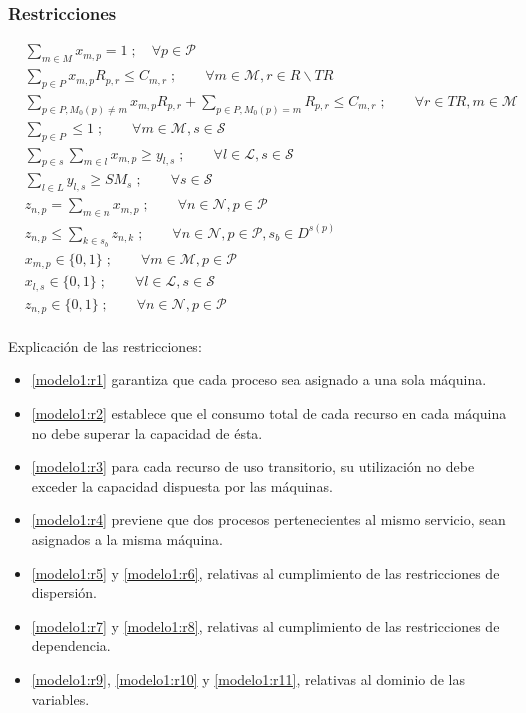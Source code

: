 \subsubsection{Restricciones}
\begin{align}
	\label{modelo1:r1} &\sum_{m \in M}x_{m,p} = 1\;; \quad \forall p \in \mathcal{P} \\ 
	\label{modelo1:r2} &\sum_{p \in P}x_{m,p}R_{p,r} \leq C_{m,r}\;; \qquad \forall m \in \mathcal{M}, r \in R\backslash TR \\
	\label{modelo1:r3} &\sum_{p \in P, M_0(p)\neq m}x_{m,p}R_{p,r}+\sum_{p\in P, M_0(p)=m}R_{p,r} \leq C_{m,r}\;; \qquad \forall r \in TR, m \in \mathcal{M} \\
	\label{modelo1:r4} &\sum_{p \in P} \leq 1\;; \qquad \forall m \in \mathcal{M}, s \in \mathcal{S} \\
	\label{modelo1:r5} &\sum_{p \in s}\sum_{m \in l}x_{m,p} \geq y_{l,s}\;; \qquad \forall l \in \mathcal{L}, s \in \mathcal{S} \\
	\label{modelo1:r6} &\sum_{l \in L}y_{l,s} \geq SM_{s}\;; \qquad \forall s \in \mathcal{S} \\
	\label{modelo1:r7} & z_{n,p} = \sum_{m \in n}x_{m,p}\;; \qquad \forall n \in \mathcal{N}, p \in \mathcal{P} \\
	\label{modelo1:r8} & z_{n,p} \leq \sum_{k \in s_b}z_{n,k}\;; \qquad \forall n \in \mathcal{N}, p \in \mathcal{P}, s_b \in D^{s(p)} \\
	\label{modelo1:r9} & x_{m,p} \in \{0,1\}\;; \qquad \forall m \in \mathcal{M}, p \in \mathcal{P} \\
	\label{modelo1:r10} & x_{l,s} \in \{0,1\}\;; \qquad \forall l \in \mathcal{L}, s \in \mathcal{S} \\
	\label{modelo1:r11} & z_{n,p} \in \{0,1\}\;; \qquad \forall n \in \mathcal{N}, p \in \mathcal{P}
\end{align}
\\
Explicación de las restricciones:
\begin{itemize}
	\item \eqref{modelo1:r1} garantiza que cada proceso sea asignado a una sola máquina.
	\item \eqref{modelo1:r2} establece que el consumo total de cada recurso en cada máquina no debe superar la capacidad de ésta.
	\item \eqref{modelo1:r3} para cada recurso de uso transitorio, su utilización no debe exceder la capacidad dispuesta por las máquinas.
	\item \eqref{modelo1:r4} previene que dos procesos pertenecientes al mismo servicio, sean asignados a la misma máquina.
	\item \eqref{modelo1:r5} y \eqref{modelo1:r6}, relativas al cumplimiento de las restricciones de dispersión.
	\item \eqref{modelo1:r7} y \eqref{modelo1:r8}, relativas al cumplimiento de las restricciones de dependencia.
	\item \eqref{modelo1:r9}, \eqref{modelo1:r10} y \eqref{modelo1:r11}, relativas al dominio de las variables.
\end{itemize}

